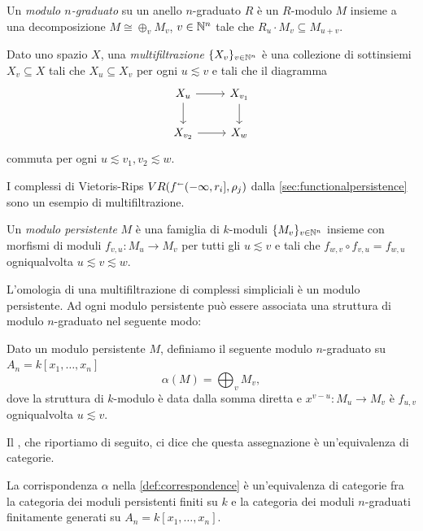 Un \emph{modulo $n$-graduato} su un anello $n$-graduato $R$ è un $R$-modulo $M$ insieme a una decomposizione $M \cong \oplus_v M_v$, $v\in\mathbb{N}^n$ tale che $R_u\cdot M_v \subseteq M_{u+v}$.

\begin{definition}\label{def:multifiltration}
  Dato uno spazio $X$, una \emph{multifiltrazione} $\{X_v\}_{v\in\mathbb{N}^n}$ è una collezione di sottinsiemi $X_v\subseteq X$ tali che $X_u\subseteq X_v$ per ogni $u\lesssim v$ e tali che il diagramma
  \begin{equation*}
  \begin{tikzcd}
    X_u\arrow{r}\arrow{d}& X_{v_1}\arrow{d}\\
    X_{v_2}\arrow{r}& X_w
  \end{tikzcd}
  \end{equation*}
  commuta per ogni $u\lesssim v_1,v_2\lesssim w$.
\end{definition}
I complessi di Vietoris-Rips $VR(f^\shortleftarrow(-\infty,r_i],\rho_j)$ dalla \cref{sec:functionalpersistence} sono un esempio di multifiltrazione.

\begin{definition}
  Un \emph{modulo persistente} $M$ è una famiglia di $k$-moduli $\{M_v\}_{v\in\mathbb{N}^n}$ insieme con morfismi di moduli $f_{v,u}:M_u\to M_v$ per tutti gli $u\lesssim v$ e tali che $f_{w,v}\circ f_{v,u}=f_{w,u}$ ogniqualvolta $u\lesssim v\lesssim w$.
\end{definition}

L'omologia di una multifiltrazione di complessi simpliciali è un modulo persistente. Ad ogni modulo persistente può essere associata una struttura di modulo $n$-graduato nel seguente modo:

\begin{definition}\label{def:correspondence}
  Dato un modulo persistente $M$, definiamo il seguente modulo $n$-graduato su $A_n=k[x_1,\dots,x_n]$
  \begin{equation*}
    \alpha(M) = \bigoplus_v M_v,
  \end{equation*}
  dove la struttura di $k$-modulo è data dalla somma diretta e $x^{v-u}:M_u \to M_v$ è $f_{u,v}$ ogniqualvolta $u\lesssim v$.
\end{definition}

Il \cite[Teorema~1]{Carlsson2009a}, che riportiamo di seguito, ci dice che questa assegnazione è un'equivalenza di categorie.

\begin{theorem}
  La corrispondenza $\alpha$ nella \cref{def:correspondence} è un'equivalenza di categorie fra la categoria dei moduli persistenti finiti su $k$ e la categoria dei moduli $n$-graduati finitamente generati su $A_n = k[x_1,\dots,x_n]$.
\end{theorem}

